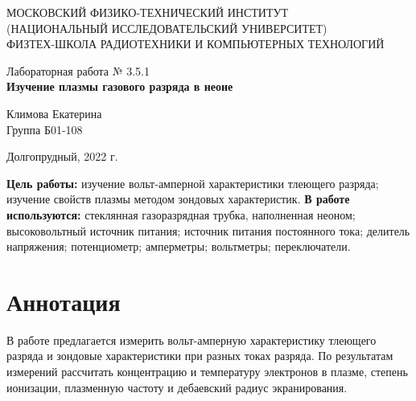 \documentclass[a4paper,12pt]{article} %
\begin{document}
\begin{center}
	\footnotesize{МОСКОВСКИЙ ФИЗИКО-ТЕХНИЧЕСКИЙ ИНСТИТУТ\\(НАЦИОНАЛЬНЫЙ 			ИССЛЕДОВАТЕЛЬСКИЙ УНИВЕРСИТЕТ)}\\
	\footnotesize{ФИЗТЕХ-ШКОЛА РАДИОТЕХНИКИ И КОМПЬЮТЕРНЫХ ТЕХНОЛОГИЙ\\}
	\hfill \break
	\hfill \break
	\hfill \break
	\hfill \break
	\hfill \break
	\hfill \break
\end{center}

\begin{center}   
    \hfill \break
	\hfill \break
	\hfill \break
	\hfill \break
	\hfill \break
	\hfill \break
	\hfill \break
	\hfill \break
	\hfill \break
	\hfill \break
	\hfill \break
	\large{Лабораторная работа № 3.5.1\\\large{\textbf{Изучение плазмы газового разряда в неоне}}}\\
	\hfill \break
	\hfill \break
	\hfill \break
	\hfill \break
	\hfill \break
	\hfill \break
	\hfill \break
	\hfill \break
	\hfill \break
	\hfill \break
	\hfill \break
	\begin{flushright}
		Климова Екатерина\\
		Группа Б01-108
	\end{flushright}
	\hfill \break
\end{center}
\hfill \break
\hfill \break
\begin{center}
	Долгопрудный, 2022 г.
\end{center}
\thispagestyle{empty}

\newpage
\hfill \break
\textbf{Цель работы:} изучение вольт-амперной характеристики тлеющего разряда; изучение свойств плазмы методом зондовых характеристик.
\hfill \break
\hfill \break
\textbf{В работе используются:} стеклянная газоразрядная трубка, наполненная неоном;  высоковольтный источник питания; источник питания постоянного тока; делитель напряжения; потенциометр; амперметры; вольтметры; переключатели.

\section{Аннотация}
\hfill \break В работе предлагается измерить вольт-амперную характеристику тлеющего разряда и зондовые характеристики при разных токах разряда. По результатам измерений рассчитать концентрацию и температуру электронов в плазме, степень ионизации, плазменную частоту и дебаевский радиус экранирования.
\end{document}
